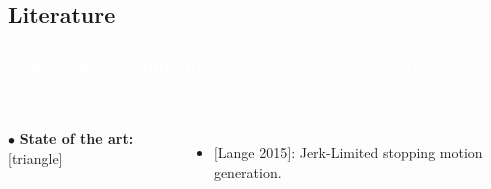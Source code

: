 %
%



















\subsection{Literature}
\begin{frame}
\frametitle{{\textcolor{white}{\hspace{0.3cm}Constraints incompatibilities, state of the art and contribution}}}

\begin{columns}
\column{\textwidth+5mm}

$\bullet$ \textbf{State of the art:}
[triangle]                        
\begin{itemize}
\item $[$Lange 2015$]$: Jerk-Limited stopping motion generation.
\end{itemize}

\end{columns}
\end{frame}









